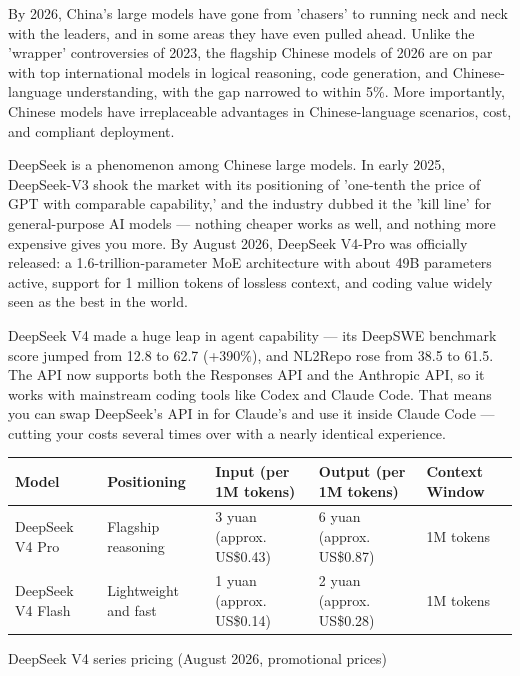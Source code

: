 
By 2026, China's large models have gone from 'chasers' to running neck and neck with the leaders, and in some areas they have even pulled ahead. Unlike the 'wrapper' controversies of 2023, the flagship Chinese models of 2026 are on par with top international models in logical reasoning, code generation, and Chinese-language understanding, with the gap narrowed to within 5\%. More importantly, Chinese models have irreplaceable advantages in Chinese-language scenarios, cost, and compliant deployment.


DeepSeek is a phenomenon among Chinese large models. In early 2025, DeepSeek-V3 shook the market with its positioning of 'one-tenth the price of GPT with comparable capability,' and the industry dubbed it the 'kill line' for general-purpose AI models — nothing cheaper works as well, and nothing more expensive gives you more. By August 2026, DeepSeek V4-Pro was officially released: a 1.6-trillion-parameter MoE architecture with about 49B parameters active, support for 1 million tokens of lossless context, and coding value widely seen as the best in the world.

DeepSeek V4 made a huge leap in agent capability — its DeepSWE benchmark score jumped from 12.8 to 62.7 (+390\%), and NL2Repo rose from 38.5 to 61.5. The API now supports both the Responses API and the Anthropic API, so it works with mainstream coding tools like Codex and Claude Code. That means you can swap DeepSeek's API in for Claude's and use it inside Claude Code — cutting your costs several times over with a nearly identical experience.

\begin{center}
\begin{tabularx}{\linewidth}{|X|X|X|X|X|}
\hline
\textbf{Model} & \textbf{Positioning} & \textbf{Input (per 1M tokens)} & \textbf{Output (per 1M tokens)} & \textbf{Context Window} \tabularnewline
\hline
DeepSeek V4 Pro & Flagship reasoning & 3 yuan (approx. US\$0.43) & 6 yuan (approx. US\$0.87) & 1M tokens \tabularnewline
DeepSeek V4 Flash & Lightweight and fast & 1 yuan (approx. US\$0.14) & 2 yuan (approx. US\$0.28) & 1M tokens \tabularnewline
\hline
\end{tabularx}
\end{center}

\begin{center}\small\color{gray}DeepSeek V4 series pricing (August 2026, promotional prices)\end{center}


